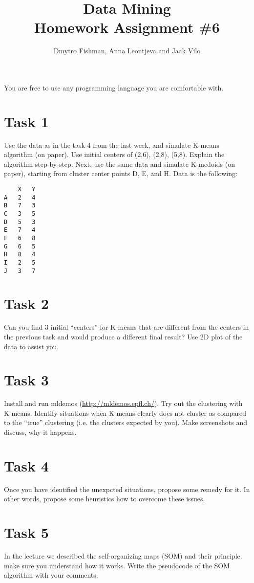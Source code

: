 \documentclass{article}
\title{Data Mining\\Homework Assignment \#6} %
\author{Dmytro Fishman, Anna Leontjeva and Jaak Vilo} %
\begin{document}
\maketitle %

You are free to use any programming language you are comfortable with.

\section*{Task 1}
Use the data as in the task 4 from the last week, and simulate K-means algorithm (on paper). Use initial centers of (2,6), (2,8), (5,8). Explain the algorithm step-by-step. 
Next, use the same data and simulate K-medoids (on paper), starting from cluster center points D, E, and H. Data is the following:
\begin{lstlisting}
	X	Y
A	2	4
B	7	3
C	3	5
D	5	3
E	7	4
F	6	8
G	6	5
H	8	4
I	2	5
J	3	7
\end{lstlisting}
\section*{Task 2}
Can you find 3 initial ``centers'' for K-means that are different from the centers in the previous task and would produce a different final result? Use 2D plot of the data to assist you.

\section*{Task 3}
Install and run mldemos (\url{http://mldemos.epfl.ch/}). Try out the clustering with K-means. Identify situations when K-means clearly does not cluster as compared  to the “true” clustering (i.e. the clusters expected by you). Make screenshots and discuss, why it happens. 

\section*{Task 4}
Once you have identified the unexpcted situations, propose some remedy for it. In other words, propose some heuristics how to overcome these issues.

\section*{Task 5}
In the lecture we described the self-organizing maps (SOM) and their principle. make sure you understand how it works. Write the pseudocode of the SOM algorithm with your comments. 
\end{document}
